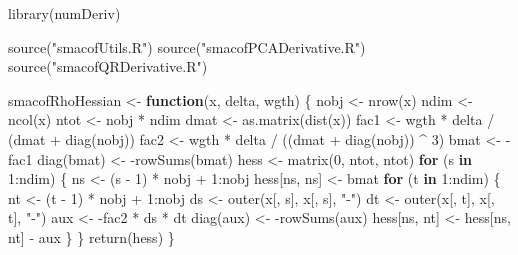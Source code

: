\documentclass[
  12pt,
  letterpaper,
  DIV=11,
  numbers=noendperiod]{scrartcl}
\newenvironment{Shaded}{\begin{snugshade}}{\end{snugshade}}
\newcommand{\ControlFlowTok}[1]{\textcolor[rgb]{0.00,0.23,0.31}{\textbf{#1}}}
\newcommand{\DecValTok}[1]{\textcolor[rgb]{0.68,0.00,0.00}{#1}}
\newcommand{\FunctionTok}[1]{\textcolor[rgb]{0.28,0.35,0.67}{#1}}
\newcommand{\NormalTok}[1]{\textcolor[rgb]{0.00,0.23,0.31}{#1}}
\newcommand{\OtherTok}[1]{\textcolor[rgb]{0.00,0.23,0.31}{#1}}
\newcommand{\SpecialCharTok}[1]{\textcolor[rgb]{0.37,0.37,0.37}{#1}}
\newcommand{\StringTok}[1]{\textcolor[rgb]{0.13,0.47,0.30}{#1}}
\begin{document}
\begin{Shaded}
\begin{Highlighting}[]
\FunctionTok{library}\NormalTok{(numDeriv)}

\FunctionTok{source}\NormalTok{(}\StringTok{"smacofUtils.R"}\NormalTok{)}
\FunctionTok{source}\NormalTok{(}\StringTok{"smacofPCADerivative.R"}\NormalTok{)}
\FunctionTok{source}\NormalTok{(}\StringTok{"smacofQRDerivative.R"}\NormalTok{)}

\NormalTok{smacofRhoHessian }\OtherTok{\textless{}{-}} \ControlFlowTok{function}\NormalTok{(x, delta, wgth) \{}
\NormalTok{  nobj }\OtherTok{\textless{}{-}} \FunctionTok{nrow}\NormalTok{(x)}
\NormalTok{  ndim }\OtherTok{\textless{}{-}} \FunctionTok{ncol}\NormalTok{(x)}
\NormalTok{  ntot }\OtherTok{\textless{}{-}}\NormalTok{ nobj }\SpecialCharTok{*}\NormalTok{ ndim}
\NormalTok{  dmat }\OtherTok{\textless{}{-}} \FunctionTok{as.matrix}\NormalTok{(}\FunctionTok{dist}\NormalTok{(x))}
\NormalTok{  fac1 }\OtherTok{\textless{}{-}}\NormalTok{ wgth }\SpecialCharTok{*}\NormalTok{ delta }\SpecialCharTok{/}\NormalTok{ (dmat }\SpecialCharTok{+} \FunctionTok{diag}\NormalTok{(nobj))}
\NormalTok{  fac2 }\OtherTok{\textless{}{-}}\NormalTok{ wgth }\SpecialCharTok{*}\NormalTok{ delta }\SpecialCharTok{/}\NormalTok{ ((dmat }\SpecialCharTok{+} \FunctionTok{diag}\NormalTok{(nobj)) }\SpecialCharTok{\^{}} \DecValTok{3}\NormalTok{)}
\NormalTok{  bmat }\OtherTok{\textless{}{-}} \SpecialCharTok{{-}}\NormalTok{fac1}
  \FunctionTok{diag}\NormalTok{(bmat) }\OtherTok{\textless{}{-}} \SpecialCharTok{{-}}\FunctionTok{rowSums}\NormalTok{(bmat)}
\NormalTok{  hess }\OtherTok{\textless{}{-}} \FunctionTok{matrix}\NormalTok{(}\DecValTok{0}\NormalTok{, ntot, ntot)}
  \ControlFlowTok{for}\NormalTok{ (s }\ControlFlowTok{in} \DecValTok{1}\SpecialCharTok{:}\NormalTok{ndim) \{}
\NormalTok{    ns }\OtherTok{\textless{}{-}}\NormalTok{ (s }\SpecialCharTok{{-}} \DecValTok{1}\NormalTok{) }\SpecialCharTok{*}\NormalTok{ nobj }\SpecialCharTok{+} \DecValTok{1}\SpecialCharTok{:}\NormalTok{nobj}
\NormalTok{    hess[ns, ns] }\OtherTok{\textless{}{-}}\NormalTok{ bmat}
    \ControlFlowTok{for}\NormalTok{ (t }\ControlFlowTok{in} \DecValTok{1}\SpecialCharTok{:}\NormalTok{ndim) \{}
\NormalTok{      nt }\OtherTok{\textless{}{-}}\NormalTok{ (t }\SpecialCharTok{{-}} \DecValTok{1}\NormalTok{) }\SpecialCharTok{*}\NormalTok{ nobj }\SpecialCharTok{+} \DecValTok{1}\SpecialCharTok{:}\NormalTok{nobj}
\NormalTok{      ds }\OtherTok{\textless{}{-}} \FunctionTok{outer}\NormalTok{(x[, s], x[, s], }\StringTok{"{-}"}\NormalTok{)}
\NormalTok{      dt }\OtherTok{\textless{}{-}} \FunctionTok{outer}\NormalTok{(x[, t], x[, t], }\StringTok{"{-}"}\NormalTok{)}
\NormalTok{      aux }\OtherTok{\textless{}{-}} \SpecialCharTok{{-}}\NormalTok{fac2 }\SpecialCharTok{*}\NormalTok{ ds }\SpecialCharTok{*}\NormalTok{ dt}
      \FunctionTok{diag}\NormalTok{(aux) }\OtherTok{\textless{}{-}} \SpecialCharTok{{-}}\FunctionTok{rowSums}\NormalTok{(aux)}
\NormalTok{      hess[ns, nt] }\OtherTok{\textless{}{-}}\NormalTok{ hess[ns, nt] }\SpecialCharTok{{-}}\NormalTok{ aux}
\NormalTok{    \}}
\NormalTok{  \}}
  \FunctionTok{return}\NormalTok{(hess)}
\NormalTok{\}}


\end{Highlighting}
\end{Shaded}
\end{document}
